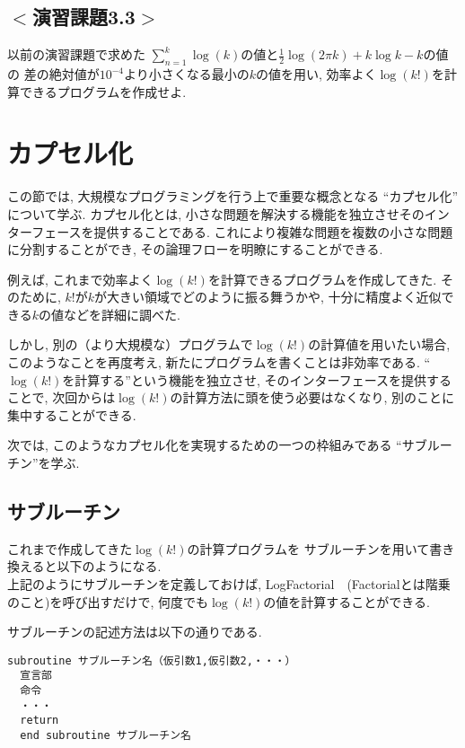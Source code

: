 \subsection*{$<$演習課題3.3$>$}
以前の演習課題で求めた
$\sum_{n=1}^{k}\log(k)$の値と$\frac{1}{2}\log(2\pi k) + k\log{k}-k$の値の
差の絶対値が$10^{-4}$より小さくなる最小の$k$の値を用い, 
効率よく$\log(k!)$を計算できるプログラムを作成せよ. 



\section{カプセル化}
この節では, 大規模なプログラミングを行う上で重要な概念となる
``カプセル化'' について学ぶ. 
カプセル化とは, 小さな問題を解決する機能を独立させそのインターフェースを提供することである. 
これにより複雑な問題を複数の小さな問題に分割することができ, その論理フローを明瞭にすることができる. 
\newline

例えば, これまで効率よく$\log(k!)$を計算できるプログラムを作成してきた. 
そのために, $k!$が$k$が大きい領域でどのように振る舞うかや, 
十分に精度よく近似できる$k$の値などを詳細に調べた. 

しかし, 別の（より大規模な）プログラムで$\log(k!)$の計算値を用いたい場合, 
このようなことを再度考え, 新たにプログラムを書くことは非効率である. 
``$\log(k!)$を計算する''という機能を独立させ, そのインターフェースを提供することで, 
次回からは$\log(k!)$の計算方法に頭を使う必要はなくなり, 別のことに集中することができる. 


次では, 
このようなカプセル化を実現するための一つの枠組みである
``サブルーチン''を学ぶ. 


\subsection{サブルーチン}
これまで作成してきた$\log(k!)$の計算プログラムを
サブルーチンを用いて書き換えると以下のようになる. \\



上記のようにサブルーチンを定義しておけば, {\ttfamily LogFactorial}　(Factorialとは階乗のこと)を呼び出すだけで, 
何度でも$\log(k!)$の値を計算することができる. 

サブルーチンの記述方法は以下の通りである. 
\begin{Verbatim}[frame=single]
  subroutine サブルーチン名（仮引数1,仮引数2,・・・）
  宣言部
  命令
  ・・・
  return
  end subroutine サブルーチン名
\end{Verbatim}

